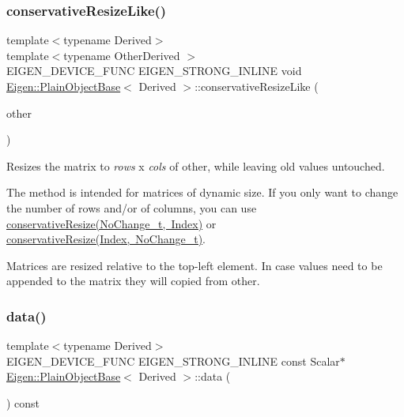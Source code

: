 \subsubsection{\texorpdfstring{conservativeResizeLike()}{conservativeResizeLike()}}
{\footnotesize\ttfamily template$<$typename Derived$>$ \\
template$<$typename Other\+Derived $>$ \\
E\+I\+G\+E\+N\+\_\+\+D\+E\+V\+I\+C\+E\+\_\+\+F\+U\+NC E\+I\+G\+E\+N\+\_\+\+S\+T\+R\+O\+N\+G\+\_\+\+I\+N\+L\+I\+NE void \mbox{\hyperlink{class_eigen_1_1_plain_object_base}{Eigen\+::\+Plain\+Object\+Base}}$<$ Derived $>$\+::conservative\+Resize\+Like (\begin{DoxyParamCaption}\item[{const \mbox{\hyperlink{class_eigen_1_1_dense_base}{Dense\+Base}}$<$ Other\+Derived $>$ \&}]{other }\end{DoxyParamCaption})\hspace{0.3cm}{\ttfamily [inline]}}

Resizes the matrix to {\itshape rows} x {\itshape cols} of {\ttfamily other}, while leaving old values untouched.

The method is intended for matrices of dynamic size. If you only want to change the number of rows and/or of columns, you can use \mbox{\hyperlink{class_eigen_1_1_plain_object_base_a46afa73816539b0fe36c6e9abd7978a6}{conservative\+Resize(\+No\+Change\+\_\+t, Index)}} or \mbox{\hyperlink{class_eigen_1_1_plain_object_base_a528879aef40f9cbc4ab4925e4a6bceb9}{conservative\+Resize(\+Index, No\+Change\+\_\+t)}}.

Matrices are resized relative to the top-\/left element. In case values need to be appended to the matrix they will copied from {\ttfamily other}. \mbox{\label{class_eigen_1_1_plain_object_base_ac25699535374b1854cf8494e44ad31b2}} 
\subsubsection{\texorpdfstring{data()}{data()}\hspace{0.1cm}{\footnotesize\ttfamily [1/2]}}
{\footnotesize\ttfamily template$<$typename Derived$>$ \\
E\+I\+G\+E\+N\+\_\+\+D\+E\+V\+I\+C\+E\+\_\+\+F\+U\+NC E\+I\+G\+E\+N\+\_\+\+S\+T\+R\+O\+N\+G\+\_\+\+I\+N\+L\+I\+NE const Scalar$\ast$ \mbox{\hyperlink{class_eigen_1_1_plain_object_base}{Eigen\+::\+Plain\+Object\+Base}}$<$ Derived $>$\+::data (\begin{DoxyParamCaption}{ }\end{DoxyParamCaption}) const\hspace{0.3cm}{\ttfamily [inline]}}

